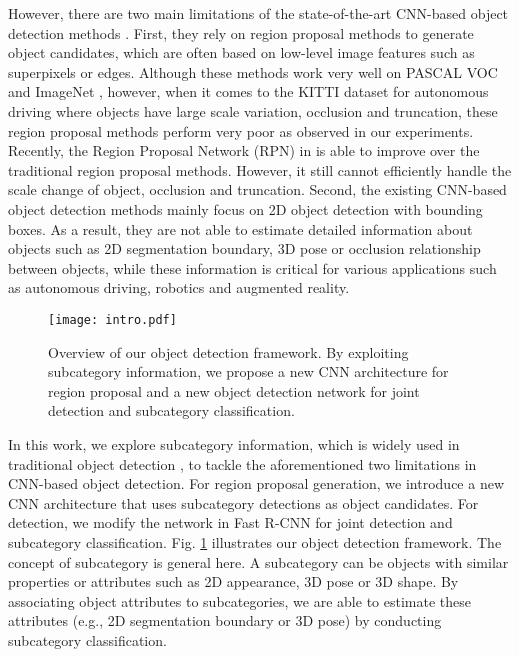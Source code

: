 \documentclass[10pt,twocolumn,letterpaper]{article}
\begin{document}
However, there are two main limitations of the state-of-the-art CNN-based object detection methods \cite{girshick2013rich,girshick2015fast,ren2015faster}. First, they rely on region proposal methods \cite{uijlings2013selective,zitnick2014edge,arbelaez2014multiscale} to generate object candidates, which are often based on low-level image features such as superpixels or edges. Although these methods work very well on PASCAL VOC \cite{pascal-voc-2012} and ImageNet \cite{ILSVRC15}, however, when it comes to the KITTI dataset for autonomous driving \cite{geiger2012we} where objects have large scale variation, occlusion and truncation, these region proposal methods perform very poor as observed in our experiments. Recently, the Region Proposal Network (RPN) in \cite{ren2015faster} is able to improve over the traditional region proposal methods. However, it still cannot efficiently handle the scale change of object, occlusion and truncation. Second, the existing CNN-based object detection methods mainly focus on 2D object detection with bounding boxes. As a result, they are not able to estimate detailed information about objects such as 2D segmentation boundary, 3D pose or occlusion relationship between objects, while these information is critical for various applications such as autonomous driving, robotics and augmented reality. 

\begin{figure} [t]\small
	\centering
	\texttt{[image: intro.pdf]}
	\caption{Overview of our object detection framework. By exploiting subcategory information, we propose a new CNN architecture for region proposal and a new object detection network for joint detection and subcategory classification.}
	\label{fig:intro}
	\vspace{-4mm}
\end{figure}

In this work, we explore subcategory information, which is widely used in traditional object detection \cite{felzenszwalb2010object,subcat15,xiang2015data}, to tackle the aforementioned two limitations in CNN-based object detection. For region proposal generation, we introduce a new CNN architecture that uses subcategory detections as object candidates. For detection, we modify the network in Fast R-CNN \cite{girshick2015fast} for joint detection and subcategory classification. Fig. \ref{fig:intro} illustrates our object detection framework. The concept of subcategory is general here. A subcategory can be objects with similar properties or attributes such as 2D appearance, 3D pose or 3D shape. By associating object attributes to subcategories, we are able to estimate these attributes (e.g., 2D segmentation boundary or 3D pose) by conducting subcategory classification.
\end{document}
